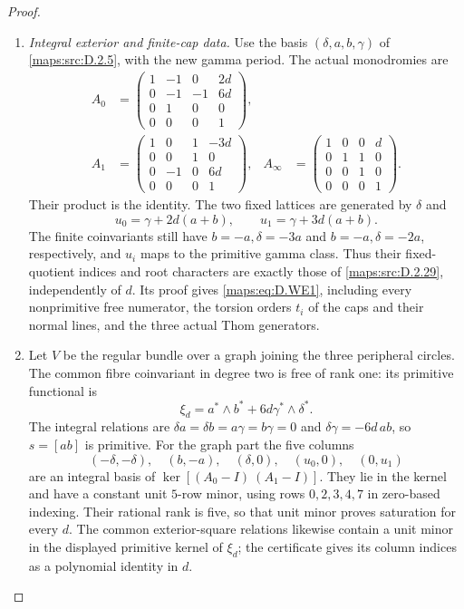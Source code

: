 \begin{proof}
\begin{enumerate}[label=\arabic*.,leftmargin=*]
\item \emph{Integral exterior and finite-cap data.}
Use the basis $(\delta,a,b,\gamma)$ of \ref{maps:src:D.2.5}, with
the new gamma period. The actual monodromies are
\[
\begin{aligned}
 A_0&=\begin{pmatrix}
 1&-1&0&2d\\0&-1&-1&6d\\0&1&0&0\\0&0&0&1
 \end{pmatrix},\\
 A_1&=\begin{pmatrix}
 1&0&1&-3d\\0&0&1&0\\0&-1&0&6d\\0&0&0&1
 \end{pmatrix},&
 A_\infty&=\begin{pmatrix}
 1&0&0&d\\0&1&1&0\\0&0&1&0\\0&0&0&1
 \end{pmatrix}.
\end{aligned}                                             \tag{D.WE10}\label{maps:eq:D.WE10}
\]
Their product is the identity. The two fixed lattices
are generated by $\delta$ and
\[
 u_0=\gamma+2d(a+b),\qquad
 u_1=\gamma+3d(a+b).
\]
The finite coinvariants still have
$b=-a,\delta=-3a$ and $b=-a,\delta=-2a$,
respectively, and $u_i$ maps to the primitive gamma
class. Thus their fixed-quotient indices and root
characters are exactly those of \ref{maps:src:D.2.29}, independently
of $d$. Its proof gives \eqref{maps:eq:D.WE1}, including every
nonprimitive free numerator, the torsion orders
$t_i$ of the caps and their normal lines, and the
three actual Thom generators.

\item Let $V$ be the regular bundle over a graph joining
the three peripheral circles. The common fibre
coinvariant in degree two is free of rank one:
its primitive functional is
\[
 \xi_d=a^*\wedge b^*+6d\gamma^*\wedge\delta^* .
\]
The integral relations are
$\delta a=\delta b=a\gamma=b\gamma=0$ and
$\delta\gamma=-6d\,ab$, so $s=[ab]$ is primitive.
For the graph part the five columns
\[
 (-\delta,-\delta),\quad(b,-a),\quad
 (\delta,0),\quad(u_0,0),\quad(0,u_1)                     \tag{D.WE11}\label{maps:eq:D.WE11}
\]
are an integral basis of
$\ker[(A_0-I)\ (A_1-I)]$.
They lie in the kernel and have a constant unit
$5$-row minor, using rows $0,2,3,4,7$ in zero-based
indexing. Their rational rank is five, so that unit
minor proves saturation for every $d$.
The common exterior-square relations likewise contain
a unit minor in the displayed primitive kernel of
$\xi_d$; the certificate gives its column indices
as a polynomial identity in $d$.


\end{enumerate}
\end{proof}
